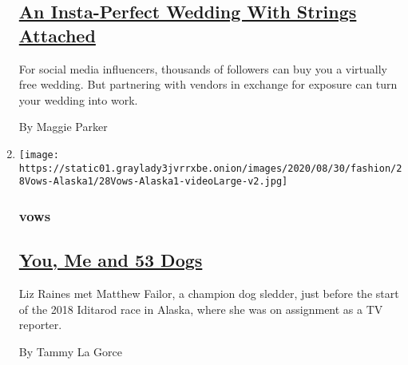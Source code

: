 \begin{enumerate}
  \hypertarget{an-insta-perfect-wedding-with-strings-attached}{%
  \subsection{\texorpdfstring{\href{/2020/09/02/fashion/weddings/an-insta-perfect-wedding-with-strings-attached.html}{An
  Insta-Perfect Wedding With Strings
  Attached}}{An Insta-Perfect Wedding With Strings Attached}}\label{an-insta-perfect-wedding-with-strings-attached}}

  For social media influencers, thousands of followers can buy you a
  virtually free wedding. But partnering with vendors in exchange for
  exposure can turn your wedding into work.

  By Maggie Parker
\item
  \texttt{[image: https://static01.graylady3jvrrxbe.onion/images/2020/08/30/fashion/28Vows-Alaska1/28Vows-Alaska1-videoLarge-v2.jpg]}

  \hypertarget{vows-2}{%
  \subsubsection{vows}\label{vows-2}}

  \hypertarget{you-me-and-53-dogs}{%
  \subsection{\texorpdfstring{\href{/2020/08/28/fashion/weddings/Musher-Matthew-Failor-marries-Liz-Raines-Alaska.html}{You,
  Me and 53 Dogs}}{You, Me and 53 Dogs}}\label{you-me-and-53-dogs}}

  Liz Raines met Matthew Failor, a champion dog sledder, just before the
  start of the 2018 Iditarod race in Alaska, where she was on assignment
  as a TV reporter.

  By Tammy La Gorce
\end{enumerate}

